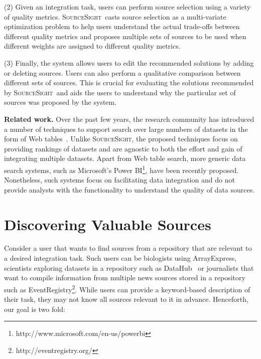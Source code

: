 \documentclass{vldb}
\newcommand\system{\textsc{SourceSight}}
\begin{document}
\vspace{2pt}\noindent (2) Given an integration task, users can perform source selection using a variety of quality metrics. \system~casts source selection as a multi-variate optimization problem to help users understand the actual trade-offs between different quality metrics and proposes multiple sets of sources to be used when different weights are assigned to different quality metrics. 

\vspace{2pt}\noindent (3) Finally, the system allows users to edit the recommended solutions by adding or deleting sources. Users can also perform a qualitative comparison between different sets of sources. This is crucial for evaluating the solutions recommended by \system~and aids the users to understand why the particular set of sources was proposed by the system.

\noindent\textbf{Related work.} Over the past few years, the research community has introduced a number of techniques to support search over large numbers of datasets in the form of Web tables~\cite{limaye:2010,dassarma:2012,yakout:2012}. Unlike \system, the proposed techniques focus on providing rankings of datasets and are agnostic to both the effort and gain of integrating multiple datasets. Apart from Web table search, more generic data search systems, such as Microsoft's Power BI\footnote{http://www.microsoft.com/en-us/powerbi}, have been recently proposed. Nonetheless, such systems focus on facilitating data integration and do not provide analysts with the functionality to understand the quality of data sources.


\section{Discovering Valuable Sources}
\label{sec:sources}
Consider a user that wants to find sources from a repository that are relevant to a desired integration task. Such users can be biologists using ArrayExpress, scientists exploring datasets in a repository such as DataHub~\cite{datahub} or journalists that want to compile information from multiple news sources stored in a repository such as EventRegistry\footnote{http://eventregistry.org/}. While users can provide a keyword-based description of their task, they may not know all sources relevant to it in advance. Henceforth, our goal is two fold: 
\end{document}
